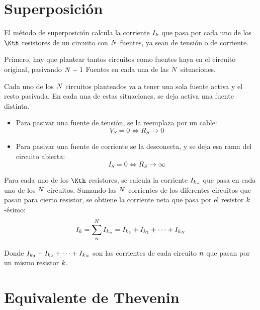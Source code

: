 \documentclass[a5paper,12pt,twoside]{book}
\begin{document}


\section{Superposición}

El método de superposición calcula la corriente $I_k$ que pasa por cada uno de los $\Kth$ resistores de un circuito con $N$ fuentes, ya sean de tensión o de corriente.

Primero, hay que plantear tantos circuitos como fuentes haya en el circuito original, pasivando $N-1$ Fuentes en cada una de las $N$ situaciones.

Cada uno de los $N$ circuitos planteados va a tener una sola fuente activa y el resto pasivada. En cada una de estas situaciones, se deja activa una fuente distinta.

\begin{itemize}
    \item Para pasivar una fuente de tensión, se la reemplaza por un cable:
    \begin{equation*}
        V_S = 0 \iff R_S \to 0
    \end{equation*}

    \item Para pasivar una fuente de corriente se la desconecta, y se deja esa rama del circuito abierta:
    \begin{equation*}
        I_S = 0 \iff R_S \to \infty
    \end{equation*}
\end{itemize}

Para cada uno de los $\Kth$ resistores, se calcula la corriente $I_{k_n}$ que pasa en cada uno de los $N$ circuitos. Sumando las $N$ corrientes de los diferentes circuitos que pasan para cierto resistor, se obtiene la corriente neta que pasa por el resistor $k$-ésimo:
\begin{equation*}
    I_k = \sum_n^N I_{k_n} = I_{k_3} + I_{k_2} + \dots + I_{k_N}
\end{equation*}

Donde $I_{k_3} + I_{k_2} + \dots + I_{k_N}$ son las corrientes de cada circuito $n$ que pasan por un mismo resistor $k$.


\section{Equivalente de Thevenin}
\end{document}
